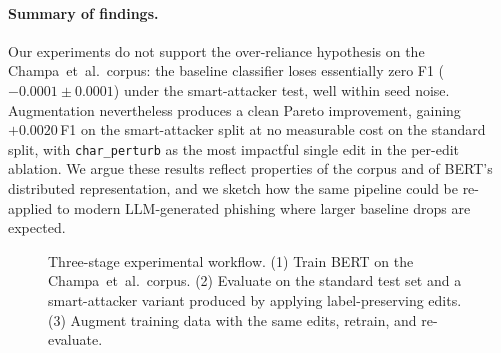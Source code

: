 \documentclass[conference]{IEEEtran}
\begin{document}
\paragraph*{Summary of findings.} Our experiments do not support the
over-reliance hypothesis on the Champa~et~al.\ corpus: the baseline
classifier loses essentially zero F1 ($-0.0001 \pm 0.0001$) under the
smart-attacker test, well within seed noise. Augmentation nevertheless
produces a clean Pareto improvement, gaining $+0.0020$\,F1 on the
smart-attacker split at no measurable cost on the standard split, with
\texttt{char\_perturb} as the most impactful single edit in the per-edit
ablation. We argue these results reflect properties of the corpus and of
BERT's distributed representation, and we sketch how the same pipeline
could be re-applied to modern LLM-generated phishing where larger
baseline drops are expected.

\begin{figure}[t]
\centering
{}
\caption{Three-stage experimental workflow. (1) Train BERT on the
Champa~et~al.\ corpus. (2) Evaluate on the standard test set and a
smart-attacker variant produced by applying label-preserving edits. (3)
Augment training data with the same edits, retrain, and re-evaluate.}
\label{fig:workflow}
\end{figure}
\end{document}
